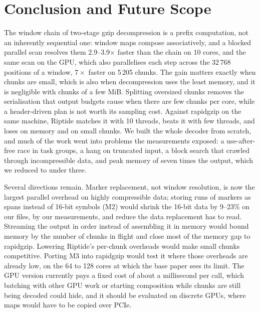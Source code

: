 \documentclass[conference]{IEEEtran}
\begin{document}
\section{Conclusion and Future Scope}

The window chain of two-stage gzip decompression is a prefix computation, not an
inherently sequential one: window maps compose associatively, and a blocked parallel
scan resolves them 2.9--3.9$\times$ faster than the chain on 10 cores, and the same
scan on the GPU, which also parallelises each step across the 32\,768 positions of a
window, $7\times$ faster on 5\,205 chunks. The gain
matters exactly when chunks are small, which is also when decompression uses the
least memory, and it is negligible with chunks of a few MiB. Splitting
oversized chunks removes the serialisation that output budgets cause when there are
few chunks per core, while a header-driven plan is not worth its sampling cost.
Against rapidgzip on the same machine, Riptide matches it with 10 threads, beats it
with few threads, and loses on memory and on small chunks. We
built the whole decoder from scratch, and much of the work went into problems the
measurements exposed: a use-after-free race in task groups, a hang on truncated
input, a block search that crawled through incompressible data, and peak memory of
seven times the output, which we reduced to under three.

Several directions remain. Marker replacement, not window resolution, is now the
largest parallel overhead on highly compressible data; storing runs of markers as
spans instead of 16-bit symbols (M2) would shrink the 16-bit data by 9--23\% on our
files, by our measurements, and reduce the data replacement has to read.
Streaming the output in order instead of assembling it in memory would bound memory
by the number of chunks in flight and close most of the memory gap to rapidgzip.
Lowering Riptide's per-chunk overheads would make small chunks competitive. Porting
M3 into rapidgzip would test it where those overheads are already low, on the 64 to
128 cores at which the base paper sees its limit. The GPU version currently pays a
fixed cost of about a millisecond per call, which batching with other GPU work or
starting composition while chunks are still being decoded could hide, and it should be
evaluated on discrete GPUs, where maps would have to be copied over PCIe.
\end{document}
